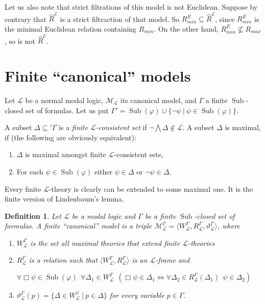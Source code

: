 \documentclass[a4paper]{article}
\theoremstyle{defin}
\newtheorem{defin}{Definition}
\theoremstyle{theorem}
\theoremstyle{prop}
\theoremstyle{lemma}
\theoremstyle{fact}
\theoremstyle{ex}
\theoremstyle{col}
\begin{document}
Let us also note that strict filtrations of this model is not Euclidean.
Suppose by contrary that $\widehat{R}^{\mathcal{E}}$ is a strict filtraction of that model. So $R_{min}^E \subseteq \widehat{R}^{\mathcal{E}}$, since $R_{min}^E$ is the minimal Euclidean relation containing $R_{min}$. On the other hand, $R_{min}^E \not\subseteq R_{max}$, so is not $\widehat{R}^{\mathcal{E}}$.

\section{Finite ``canonical'' models}

Let $\mathcal{L}$ be a normal modal logic, $\mathcal{M}_{\mathcal{L}}$ its canonical model, and $\Gamma$ a finite $\operatorname{Sub}$-closed set of formulas. Let us put $\Gamma' = \operatorname{Sub}(\varphi) \cup \{ \neg \psi \: | \: \psi \in \operatorname{Sub}(\varphi) \}$.

A subset $\Delta \subseteq '\Gamma$ is a \emph{finite $\mathcal{L}$-consistent set} if $\neg \bigwedge \Delta \notin \mathcal{L}$. A subset $\Delta$ is maximal, if (the following are obviously equivalent):
\begin{enumerate}
  \item $\Delta$ is maximal amongst finite $\mathcal{L}$-consistent sets,
  \item For each $\psi \in \operatorname{Sub}(\varphi)$ either $\psi \in \Delta$ or
  $\neg \psi \in \Delta$.
\end{enumerate}

Every finite $\mathcal{L}$-theory is clearly can be extended to some maximal one. It is the finite version of Lindenbaum's lemma.

\begin{defin}\label{fin}
  Let $\mathcal{L}$ be a modal logic and $\Gamma$ be a finite $\operatorname{Sub}$-closed set of formulas. A finite ``canonical'' model is a triple $\mathcal{M}_{\mathcal{L}}^{\Gamma} = \langle W_{\mathcal{L}}^{\Gamma}, R_{\mathcal{L}}^{\Gamma}, \vartheta_{\mathcal{L}}^{\Gamma} \rangle$, where
  \begin{enumerate}
    \item $W_{\mathcal{L}}^{\Gamma}$ is the set all maximal theories that extend finite $\mathcal{L}$-theories
    \item $R_{\mathcal{L}}^{\Gamma}$ is a relation such that
    $\langle W_{\mathcal{L}}^{\Gamma}, R_{\mathcal{L}}^{\Gamma} \rangle$ is an $\mathcal{L}$-frame
    and
    \begin{center}
    $\forall \Box \psi \in \operatorname{Sub}(\varphi) \:\:
    \forall \Delta_1 \in W_{\mathcal{L}}^{\Gamma} \:\: (\Box \psi \in \Delta_1 \Leftrightarrow
    \forall \Delta_2 \in R_{\mathcal{L}}^{\Gamma}(\Delta_1) \:\: \psi \in \Delta_2)$
    \end{center}
    \item $\vartheta_{\mathcal{L}}^{\Gamma}(p) = \{ \Delta \in W_{\mathcal{L}}^{\varphi} \: | \: p \in \Delta \}$ for every variable $p \in \Gamma$.
  \end{enumerate}
\end{defin}
\end{document}
